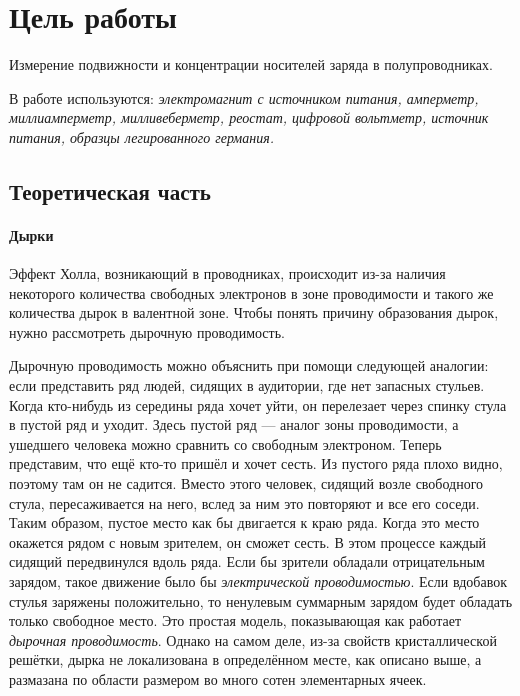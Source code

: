 \documentclass{physlab}
\begin{document}
	

\section{Цель работы}
Измерение подвижности и концентрации носителей заряда в полупроводниках.

В работе используются: \textit{электромагнит с источником питания, амперметр, миллиамперметр, милливеберметр, реостат, цифровой вольтметр, источник питания, образцы легированного германия.}


\subsection*{Теоретическая часть}

\paragraph{Дырки}

Эффект Холла, возникающий в проводниках, происходит из-за наличия некоторого количества свободных электронов в зоне проводимости и такого же количества дырок в валентной зоне. Чтобы понять причину образования дырок, нужно рассмотреть дырочную проводимость.


Дырочную проводимость можно объяснить при помощи следующей аналогии: если представить ряд людей, сидящих в аудитории, где нет запасных стульев. Когда кто-нибудь из середины ряда хочет уйти, он      перелезает через спинку стула в пустой ряд и уходит. Здесь пустой ряд — аналог зоны проводимости, а ушедшего человека можно сравнить со свободным электроном.
Теперь представим, что ещё кто-то пришёл и хочет сесть. Из пустого ряда плохо видно, поэтому там он не садится. Вместо этого человек, сидящий возле свободного стула, пересаживается на него, вслед за ним это повторяют и все его соседи. Таким образом, пустое место как бы двигается к краю ряда. Когда это место окажется рядом с новым зрителем, он сможет сесть.
В этом процессе каждый сидящий передвинулся вдоль ряда. Если бы зрители обладали отрицательным зарядом, такое движение было бы  \textit{электрической проводимостью}. Если вдобавок стулья заряжены положительно, то ненулевым суммарным зарядом будет обладать только свободное место. Это простая модель, показывающая как работает \textit{дырочная проводимость}. Однако на самом деле, из-за свойств кристаллической решётки, дырка не локализована в определённом месте, как описано выше, а размазана по области размером во много сотен элементарных ячеек.\\[-10mm]
\end{document}

